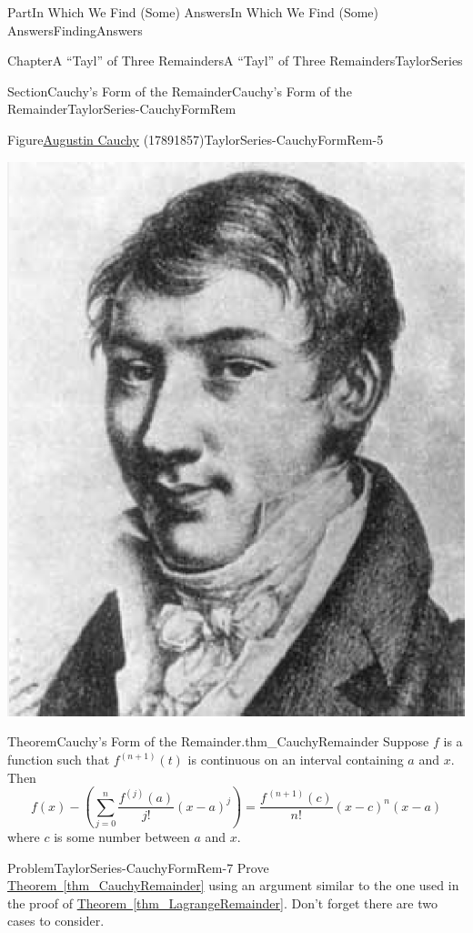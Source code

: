 \documentclass[oneside,10pt,]{book}
\newcommand{\xreffont}{\relax}
\numberwithin{equation}{part}
\begin{document}
\begin{partptx}{Part}{In Which We Find (Some) Answers}{}{In Which We Find (Some) Answers}{}{}{FindingAnswers}
\begin{chapterptx}{Chapter}{A ``Tayl'' of Three Remainders}{}{A ``Tayl'' of Three Remainders}{}{}{TaylorSeries}
\begin{sectionptx}{Section}{Cauchy's Form of the Remainder}{}{Cauchy's Form of the Remainder}{}{}{TaylorSeries-CauchyFormRem}
\begin{figureptx}{Figure}{\href{https://mathshistory.st-andrews.ac.uk/Biographies/Cauchy/}{Augustin Cauchy} (1789\textendash{}1857)}{TaylorSeries-CauchyFormRem-5}{}
\begin{image}{0.325}{0.35}{0.325}{}
\includegraphics[width=\linewidth]{external/images/Cauchy.png}
\end{image}%
\tcblower
\end{figureptx}%
\begin{theorem}{Theorem}{Cauchy's Form of the Remainder.}{}{thm_CauchyRemainder}%
%
%
Suppose \(f\) is a function such that \(f^{(n+1)}(t)\) is continuous on an interval containing \(a\) and \(x\). Then%
\begin{equation}
f(x)-\left(\sum_{j=0}^n\frac{f^{(j)}(a)}{j!}(x-a)^j\right)=\frac{f^{\, (n+1)}(c)}{n!}(x-c)^n(x-a)\label{EQUATIONCauchyFormRemainder}
\end{equation}
where \(c\) is some number between \(a\) and \(x\).%
\end{theorem}
\begin{problem}{Problem}{}{TaylorSeries-CauchyFormRem-7}%
Prove \hyperref[thm_CauchyRemainder]{Theorem~{\xreffont\ref{thm_CauchyRemainder}}} using an argument similar to the one used in the proof of \hyperref[thm_LagrangeRemainder]{Theorem~{\xreffont\ref{thm_LagrangeRemainder}}}. Don't forget there are two cases to consider.%

\end{problem}
\end{sectionptx}
\end{chapterptx}
\end{partptx}
\end{document}
